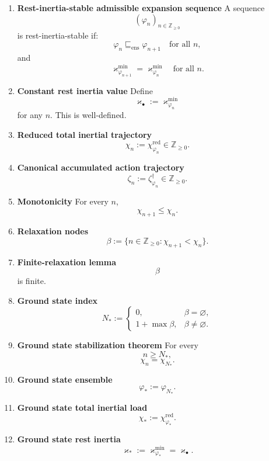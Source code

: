 \documentclass[11pt,letterpaper]{article}
\theoremstyle{plain}
\theoremstyle{definition}
\theoremstyle{remark}
\newcommand{\RestInertia}{\varkappa}
\newcommand{\TotInertia}{\chi}
\newcommand{\AccAction}{\zeta}
\newcommand{\ResEns}{\varphi}
\newcommand{\RelaxNodes}{\beta}
\begin{document}
\begin{enumerate}[resume]
\item \textbf{Rest-inertia-stable admissible expansion sequence}
A sequence
\[
(\ResEns_n)_{n\in\mathbb Z_{\ge 0}}
\]
is rest-inertia-stable if:
\[
\ResEns_n\sqsubseteq_{\mathrm{ens}}\ResEns_{n+1}
\quad\text{for all }n,
\]
and
\[
\RestInertia_{\ResEns_{n+1}}^{\min}
=
\RestInertia_{\ResEns_n}^{\min}
\quad\text{for all }n.
\]

\item \textbf{Constant rest inertia value}
Define
\[
\RestInertia_\bullet:=\RestInertia_{\ResEns_n}^{\min}
\]
for any \(n\). This is well-defined.

\item \textbf{Reduced total inertial trajectory}
\[
\TotInertia_n:=\TotInertia_{\ResEns_n}^{\mathrm{red}}\in\mathbb Z_{\ge 0}.
\]

\item \textbf{Canonical accumulated action trajectory}
\[
\AccAction_n:=\AccAction_{\ResEns_n}^{\dagger}\in\mathbb Z_{\ge 0}.
\]

\item \textbf{Monotonicity}
For every \(n\),
\[
\TotInertia_{n+1}\le \TotInertia_n.
\]

\item \textbf{Relaxation nodes}
\[
\RelaxNodes:=\{n\in\mathbb Z_{\ge 0}:\TotInertia_{n+1}<\TotInertia_n\}.
\]

\item \textbf{Finite-relaxation lemma}
\[
\RelaxNodes
\]
is finite.

\item \textbf{Ground state index}
\[
N_\ast
:=
\begin{cases}
0,& \RelaxNodes=\varnothing,\\[4pt]
1+\max\RelaxNodes,& \RelaxNodes\neq\varnothing.
\end{cases}
\]

\item \textbf{Ground state stabilization theorem}
For every
\[
n\ge N_\ast,
\]
\[
\TotInertia_n=\TotInertia_{N_\ast}.
\]

\item \textbf{Ground state ensemble}
\[
\ResEns_\ast:=\ResEns_{N_\ast}.
\]

\item \textbf{Ground state total inertial load}
\[
\TotInertia_\ast:=\TotInertia_{\ResEns_\ast}^{\mathrm{red}}.
\]

\item \textbf{Ground state rest inertia}
\[
\RestInertia_\ast:=\RestInertia_{\ResEns_\ast}^{\min}=\RestInertia_\bullet.
\]


\end{enumerate}
\end{document}
